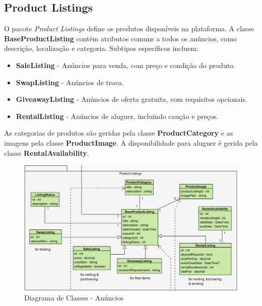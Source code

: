 \documentclass[a4paper, 12pt]{article} %
\begin{document}
\subsection{Product Listings}
O pacote \textit{Product Listings} define os produtos disponíveis na plataforma. A classe \textbf{BaseProductListing} contém atributos comuns a todos os anúncios, como descrição, localização e categoria. Subtipos específicos incluem:
\begin{itemize}
	\item \textbf{SaleListing} - Anúncios para venda, com preço e condição do produto.
	\item \textbf{SwapListing} - Anúncios de troca.
	\item \textbf{GiveawayListing} - Anúncios de oferta gratuita, com requisitos opcionais.
	\item \textbf{RentalListing} - Anúncios de aluguer, incluindo caução e preços.
\end{itemize}
As categorias de produtos são geridas pela classe \textbf{ProductCategory} e as imagens pela classe \textbf{ProductImage}. A disponibilidade para aluguer é gerida pela classe \textbf{RentalAvailability}.

\begin{figure}[ht]
	\centering
	\includegraphics[width=\textwidth]{../images/class-diagram-listings.png}
	\caption{Diagrama de Classes - Anúncios}
	\label{fig:class_diagram_listings}
\end{figure}

\newpage
\end{document}

